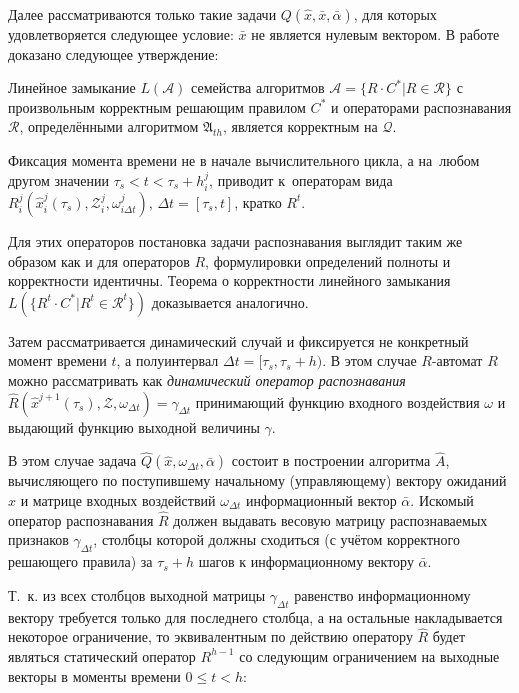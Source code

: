 Далее рассматриваются только такие задачи $Q(\hat{x},\bar{x},\bar{\alpha})$, для которых удовлетворяется следующее условие: $\bar x$ не является нулевым вектором. В работе доказано следующее утверждение:
\begin{Theorem}
	\label{th:correctness}
	Линейное замыкание $L(\mathcal A)$ семейства алгоритмов $\mathcal A=\{R\cdot C^*|R\in\mathcal R\}$ с произвольным корректным решающим правилом $C^*$ и операторами распознавания $\mathcal R$, определёнными алгоритмом $\mathfrak{A}_{th}$, является корректным на $\mathcal Q$.
\end{Theorem}

Фиксация момента времени не в начале вычислительного цикла, а на~любом другом значении $\tau_s<t<\tau_s+h_i^j$, приводит к~операторам вида $R_i^j(\hat x_i^j(\tau_s), \mathcal Z_i^j, \omega_{i\Delta t}^j)$, $\Delta t=[\tau_s, t]$,  кратко $R^t$.		

Для этих операторов постановка задачи распознавания выглядит таким же образом как и для операторов $R$, формулировки определений полноты и корректности идентичны.
Теорема о корректности линейного замыкания $L(\{R^t\cdot{C^*}|R^t\in\mathcal R^t\})$ доказывается аналогично.		

Затем рассматривается динамический случай и фиксируется не конкретный момент времени $t$, а полуинтервал ${\Delta}t=[\tau_s,\tau_s+h)$. 	В этом случае $R$-автомат $R$ можно рассматривать как \textit{динамический оператор распознавания} $\hat R(\hat x^{j+1}(\tau_s), \mathcal Z, \omega_{\Delta t})=\gamma_{\Delta t}$ принимающий  функцию входного воздействия $\omega$ и  выдающий функцию выходной величины $\gamma$. 

В этом случае задача $\hat{Q}(\hat{x}, \omega_{{\Delta}t}, \bar{\alpha})$ состоит в построении алгоритма $\hat A$, вычисляющего по поступившему начальному (управляющему) вектору ожиданий $\hat{x}$ и матрице входных воздействий $\omega_{{\Delta}t}$  информационный вектор $\bar{\alpha}$. Искомый оператор распознавания $\hat{R}$ должен выдавать весовую матрицу распознаваемых признаков $\gamma_{\Delta{t}}$, столбцы которой должны сходиться (с учётом корректного решающего правила) за $\tau_s+h$ шагов к информационному вектору $\bar\alpha$.

Т.~к. из всех столбцов выходной матрицы $\gamma_{\Delta t}$ равенство информационному вектору требуется только для последнего столбца, а на остальные накладывается некоторое ограничение, то эквивалентным по действию оператору $\hat R$ будет являться статический оператор $R^{h-1}$ со следующим ограничением на выходные векторы в моменты времени $0\leqslant t<h$:

